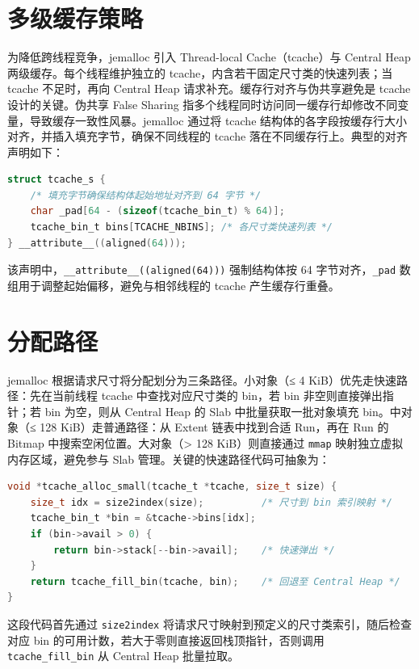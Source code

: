 \chapter{多级缓存策略}
为降低跨线程竞争，jemalloc 引入 Thread-local Cache（tcache）与 Central Heap 两级缓存。每个线程维护独立的 tcache，内含若干固定尺寸类的快速列表；当 tcache 不足时，再向 Central Heap 请求补充。缓存行对齐与伪共享避免是 tcache 设计的关键。伪共享 False Sharing 指多个线程同时访问同一缓存行却修改不同变量，导致缓存一致性风暴。jemalloc 通过将 tcache 结构体的各字段按缓存行大小对齐，并插入填充字节，确保不同线程的 tcache 落在不同缓存行上。典型的对齐声明如下：\par
\begin{lstlisting}[language=c]
struct tcache_s {
    /* 填充字节确保结构体起始地址对齐到 64 字节 */
    char _pad[64 - (sizeof(tcache_bin_t) % 64)];
    tcache_bin_t bins[TCACHE_NBINS]; /* 各尺寸类快速列表 */
} __attribute__((aligned(64)));
\end{lstlisting}
该声明中，\texttt{\_{}\_{}attribute\_{}\_{}((aligned(64)))} 强制结构体按 64 字节对齐，\texttt{\_{}pad} 数组用于调整起始偏移，避免与相邻线程的 tcache 产生缓存行重叠。\par
\chapter{分配路径}
jemalloc 根据请求尺寸将分配划分为三条路径。小对象（≤ 4 KiB）优先走快速路径：先在当前线程 tcache 中查找对应尺寸类的 bin，若 bin 非空则直接弹出指针；若 bin 为空，则从 Central Heap 的 Slab 中批量获取一批对象填充 bin。中对象（≤ 128 KiB）走普通路径：从 Extent 链表中找到合适 Run，再在 Run 的 Bitmap 中搜索空闲位置。大对象（> 128 KiB）则直接通过 \texttt{mmap} 映射独立虚拟内存区域，避免参与 Slab 管理。关键的快速路径代码可抽象为：\par
\begin{lstlisting}[language=c]
void *tcache_alloc_small(tcache_t *tcache, size_t size) {
    size_t idx = size2index(size);          /* 尺寸到 bin 索引映射 */
    tcache_bin_t *bin = &tcache->bins[idx];
    if (bin->avail > 0) {
        return bin->stack[--bin->avail];    /* 快速弹出 */
    }
    return tcache_fill_bin(tcache, bin);    /* 回退至 Central Heap */
}
\end{lstlisting}
这段代码首先通过 \texttt{size2index} 将请求尺寸映射到预定义的尺寸类索引，随后检查对应 bin 的可用计数，若大于零则直接返回栈顶指针，否则调用 \texttt{tcache\_{}fill\_{}bin} 从 Central Heap 批量拉取。\par
